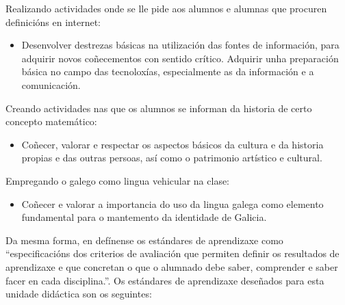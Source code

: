Realizando actividades onde se lle pide aos alumnos e alumnas que procuren definicións en internet:
\begin{itemize}
    \item Desenvolver destrezas básicas na utilización das fontes de información, para adquirir novos coñecementos con sentido crítico. Adquirir unha preparación básica no campo das tecnoloxías, especialmente as da información e a comunicación.
\end{itemize}

Creando actividades nas que os alumnos se informan da historia de certo concepto matemático:

\begin{itemize}
    \item Coñecer, valorar e respectar os aspectos básicos da cultura e da historia propias e das outras persoas, así como o patrimonio artístico e cultural.
\end{itemize}

Empregando o galego como lingua vehicular na clase:

\begin{itemize}
    \item Coñecer e valorar a importancia do uso da lingua galega como elemento fundamental para o mantemento da identidade de Galicia.
\end{itemize}

Da mesma forma, en \cite{dogcurrlomce} defínense os estándares de aprendizaxe como ``especificacións dos criterios de avaliación que permiten definir os resultados de aprendizaxe e que concretan o que o alumnado debe saber, comprender e saber facer en cada disciplina.''.  Os estándares de aprendizaxe deseñados para esta unidade didáctica son os seguintes:

